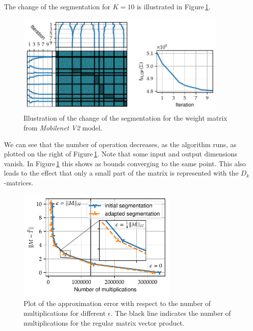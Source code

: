 \documentclass[doctype=mastersthesis,BCOR=15mm,biblatex]{ldvbook}%
\begin{document}
The change of the segmentation for $K=10$ is illustrated in Figure\,\ref{fig:mobilenet_seperation_comp}.
\begin{figure}[!htb]
	\centering
	\includegraphics[width=0.93\textwidth]{Plots/move_example_mobilenet_comp.pdf}
	\caption{Illustration of the change of the segmentation for the weight matrix from \emph{Mobilenet V2} model.
	}
	\label{fig:mobilenet_seperation_comp}
\end{figure}
We can see that the number of operation decreases, as the algorithm runs, as plotted on the right of Figure\,\ref{fig:mobilenet_seperation_comp}.
Note that some input and output dimensions vanish. 
In Figure\,\ref{fig:mobilenet_seperation_comp} this shows as bounds converging to the same point. This also leads to the effect that only a small part of the matrix is represented with the $D_k$-matrices.
\begin{figure}[!htb]
	\centering
	\includegraphics[width=0.7\textwidth]{Plots/move_example_mobilenet_error.pdf}
	\caption{Plot of the approximation error with respect to the number of multiplications for different $\epsilon$. 
	The black line indicates the number of multiplications for the regular matrix vector product. 
	}
	\label{fig:mobilenet_err_cost}
\end{figure}
\end{document}

